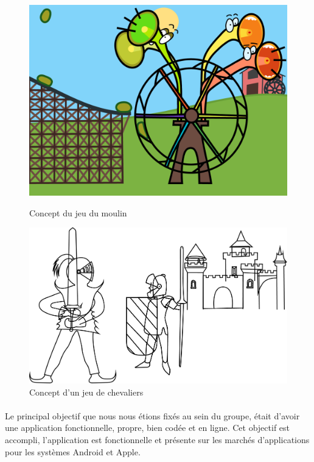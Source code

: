 \begin{figure}[H]\centering
   \begin{minipage}{0.49\textwidth}\centering
     \includegraphics[scale=0.1]{./img/concept_moulin.png}
     \caption{Concept du jeu du moulin}
     \label{jeu_concept1}
   \end{minipage}
   \begin {minipage}{0.49\textwidth}\centering
     \includegraphics[scale=0.1]{./img/concept_chevalier.png}
     \caption{Concept d'un jeu de chevaliers}
     \label{jeu_concept2}
   \end{minipage}
\end{figure}

\paragraph{}
Le principal objectif que nous nous étions fixés au sein du groupe, était d'avoir une application fonctionnelle, propre, bien codée et en ligne. Cet objectif est accompli, l'application est fonctionnelle et présente sur les marchés d'applications pour les systèmes Android et Apple.

